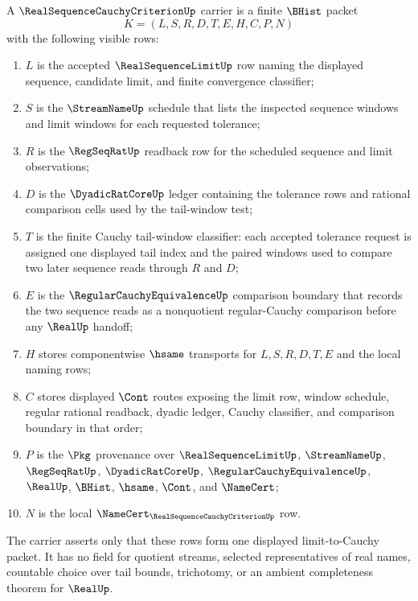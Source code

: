 \begin{definition}
\label{def:real-sequence-cauchy-criterion-carrier}
A $\RealSequenceCauchyCriterionUp$ carrier is a finite $\BHist$ packet
$$
K=(L,S,R,D,T,E,H,C,P,N)
$$
with the following visible rows:
\begin{enumerate}
\item $L$ is the accepted $\RealSequenceLimitUp$ row naming the displayed sequence, candidate limit, and finite convergence classifier;
\item $S$ is the $\StreamNameUp$ schedule that lists the inspected sequence windows and limit windows for each requested tolerance;
\item $R$ is the $\RegSeqRatUp$ readback row for the scheduled sequence and limit observations;
\item $D$ is the $\DyadicRatCoreUp$ ledger containing the tolerance rows and rational comparison cells used by the tail-window test;
\item $T$ is the finite Cauchy tail-window classifier: each accepted tolerance request is assigned one displayed tail index and the paired windows used to compare two later sequence reads through $R$ and $D$;
\item $E$ is the $\RegularCauchyEquivalenceUp$ comparison boundary that records the two sequence reads as a nonquotient regular-Cauchy comparison before any $\RealUp$ handoff;
\item $H$ stores componentwise $\hsame$ transports for $L,S,R,D,T,E$ and the local naming rows;
\item $C$ stores displayed $\Cont$ routes exposing the limit row, window schedule, regular rational readback, dyadic ledger, Cauchy classifier, and comparison boundary in that order;
\item $P$ is the $\Pkg$ provenance over $\RealSequenceLimitUp$, $\StreamNameUp$, $\RegSeqRatUp$, $\DyadicRatCoreUp$, $\RegularCauchyEquivalenceUp$, $\RealUp$, $\BHist$, $\hsame$, $\Cont$, and $\NameCert$;
\item $N$ is the local $\NameCert_{\RealSequenceCauchyCriterionUp}$ row.
\end{enumerate}
The carrier asserts only that these rows form one displayed limit-to-Cauchy packet. It has no field for quotient streams, selected representatives of real names, countable choice over tail bounds, trichotomy, or an ambient completeness theorem for $\RealUp$.
\end{definition}

